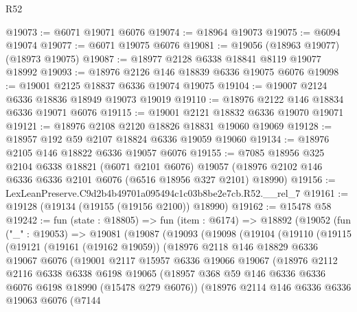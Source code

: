 \begin{lexlean}{R52}
\begin{coremodule}
@19073 := @6071 @19071 @6076
@19074 := @18964 @19073
@19075 := @6094 @19074
@19077 := @6071 @19075 @6076
@19081 := @19056 (@18963 @19077) (@18973 @19075)
@19087 := @18977 @2128 @6338 @18841 @8119 @19077 @18992
@19093 := @18976 @2126 @146 @18839 @6336 @19075 @6076
@19098 := @19001 @2125 @18837 @6336 @19074 @19075
@19104 := @19007 @2124 @6336 @18836 @18949 @19073 @19019
@19110 := @18976 @2122 @146 @18834 @6336 @19071 @6076
@19115 := @19001 @2121 @18832 @6336 @19070 @19071
@19121 := @18976 @2108 @2120 @18826 @18831 @19060 @19069
@19128 := @18957 @192 @59 @2107 @18824 @6336 @19059 @19060
@19134 := @18976 @2105 @146 @18822 @6336 @19057 @6076
@19155 := @7085
    @18956
    @325
    @2104
    @6338
    @18821
    (@6071 @2101 @6076)
    @19057
    (@18976 @2102 @146 @6336 @6336 @2101 @6076 (@6516 @18956 @327 @2101) @18990)
@19156 := LexLeanPreserve.C9d2b4b49701a095494c1c03b8be2e7cb.R52.__rel_7
@19161 := @19128 (@19134 (@19155 (@19156 @2100)) @18990)
@19162 := @15478 @58
@19242 := fun (state : @18805) =>
  fun (item : @6174) =>
  @18892
    (@19052
      (fun ("_" : @19053) =>
      @19081
        (@19087
          (@19093
            (@19098
              (@19104
                (@19110
                  (@19115
                    (@19121
                      (@19161 (@19162 @19059))
                      (@18976
                        @2118
                        @146
                        @18829
                        @6336
                        @19067
                        @6076
                        (@19001
                          @2117
                          @15957
                          @6336
                          @19066
                          @19067
                          (@18976
                            @2112
                            @2116
                            @6338
                            @6338
                            @6198
                            @19065
                            (@18957
                              @368
                              @59
                              @146
                              @6336
                              @6336
                              @6076
                              @6198
                              @18990
                              (@15478 @279 @6076))
                            (@18976
                              @2114
                              @146
                              @6336
                              @6336
                              @19063
                              @6076
                              (@7144

\end{coremodule}
\end{lexlean}
